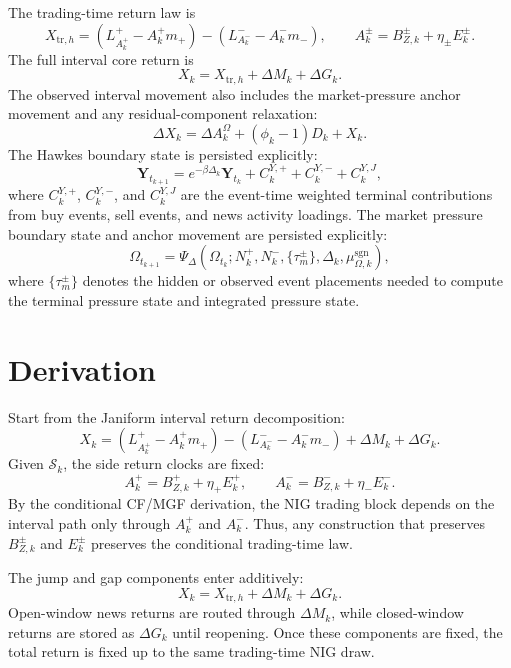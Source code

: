 \documentclass[11pt]{article}
\begin{document}
The trading-time return law is
\[
    X_{\mathrm{tr},h}
    =
    \left(L_{A_k^+}^+-A_k^+m_+\right)
    -
    \left(L_{A_k^-}^--A_k^-m_-\right),
    \qquad
    A_k^\pm=B_{Z,k}^\pm+\eta_\pm E_k^\pm.
\]
The full interval core return is
\[
    X_k
    =
    X_{\mathrm{tr},h}
    +\Delta M_k+\Delta G_k.
\]
The observed interval movement also includes the market-pressure anchor
movement and any residual-component relaxation:
\[
    \Delta X_k
    =
    \Delta A_k^\Omega
    +(\phi_k-1)D_k
    +X_k.
\]
The Hawkes boundary state is persisted explicitly:
\[
    \mathbf Y_{t_{k+1}}
    =
    e^{-\beta\Delta_k}\mathbf Y_{t_k}
    +C^{Y,+}_k
    +C^{Y,-}_k
    +C^{Y,J}_k,
\]
where \(C^{Y,+}_k\), \(C^{Y,-}_k\), and \(C^{Y,J}_k\) are the
event-time weighted terminal contributions from buy events, sell events, and
news activity loadings.
The market pressure boundary state and anchor movement are persisted
explicitly:
\[
    \Omega_{t_{k+1}}
    =
    \Psi_\Delta(
        \Omega_{t_k};
        N_k^+,
        N_k^-,
        \{\tau_m^\pm\},
        \Delta_k,
        \mu_{\Omega,k}^{\mathrm{sgn}}
    ),
\]
where \(\{\tau_m^\pm\}\) denotes the hidden or observed event placements needed
to compute the terminal pressure state and integrated pressure state.

\section{Derivation}

Start from the Janiform interval return decomposition:
\[
    X_k
    =
    \left(L_{A_k^+}^+-A_k^+m_+\right)
    -
    \left(L_{A_k^-}^--A_k^-m_-\right)
    +\Delta M_k+\Delta G_k.
\]
Given \(\mathcal S_k\), the side return clocks are fixed:
\[
    A_k^+=B_{Z,k}^++\eta_+E_k^+,
    \qquad
    A_k^-=B_{Z,k}^-+\eta_-E_k^-.
\]
By the conditional CF/MGF derivation, the NIG trading block depends on the
interval path only through \(A_k^+\) and \(A_k^-\).
Thus, any construction that preserves \(B_{Z,k}^\pm\) and \(E_k^\pm\)
preserves the conditional trading-time law.

The jump and gap components enter additively:
\[
X_k=X_{\mathrm{tr},h}+\Delta M_k+\Delta G_k.
\]
Open-window news returns are routed through \(\Delta M_k\), while closed-window
returns are stored as \(\Delta G_k\) until reopening.
Once these components are fixed, the total return is fixed up to the same
trading-time NIG draw.
\end{document}
